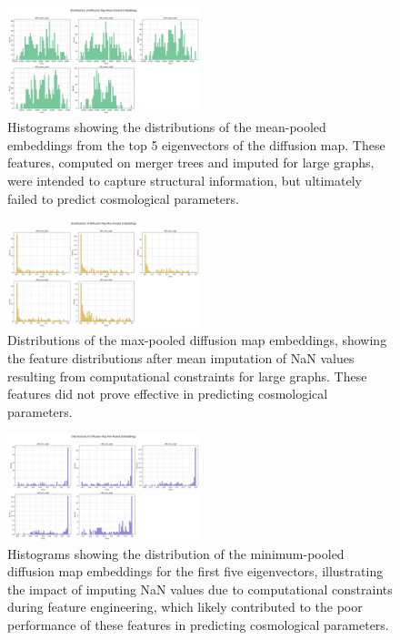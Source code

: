 \documentclass[twocolumn]{aastex631}
\begin{document}
\begin{figure}[h!]
    \centering
    \includegraphics[width=0.5\textwidth]{../input_files/plots/engineered_feature_dist_diff_mean_3_20250527-135752.png}
    \caption{Histograms showing the distributions of the mean-pooled embeddings from the top 5 eigenvectors of the diffusion map. These features, computed on merger trees and imputed for large graphs, were intended to capture structural information, but ultimately failed to predict cosmological parameters.}
    \label{fig:diffusion_feature_dist_mean}
\end{figure}

\begin{figure}[h!]
    \centering
    \includegraphics[width=0.5\textwidth]{../input_files/plots/engineered_feature_dist_diff_max_4_20250527-135752.png}
    \caption{Distributions of the max-pooled diffusion map embeddings, showing the feature distributions after mean imputation of NaN values resulting from computational constraints for large graphs. These features did not prove effective in predicting cosmological parameters.}
    \label{fig:diffusion_feature_dist}
\end{figure}

\begin{figure}[h!]
    \centering
    \includegraphics[width=0.5\textwidth]{../input_files/plots/engineered_feature_dist_diff_min_5_20250527-135752.png}
    \caption{Histograms showing the distribution of the minimum-pooled diffusion map embeddings for the first five eigenvectors, illustrating the impact of imputing NaN values due to computational constraints during feature engineering, which likely contributed to the poor performance of these features in predicting cosmological parameters.}
    \label{fig:diffusion_feature_dist_min}
\end{figure}
\end{document}

